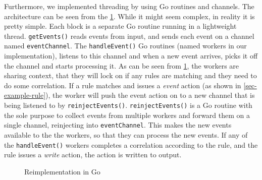 Furthermore, we implemented threading by using Go routines and channels. The architecture can be seen from the \cref{fig:reimplementation-architecture}. While it might seem complex, in reality it is pretty simple. Each block is a separate Go routine running in a lightweight thread. \lstinline{getEvents()} reads events from input, and sends each event on a channel named \lstinline{eventChannel}. The \lstinline{handleEvent()} Go routines (named workers in our implementation), listens to this channel and when a new event arrives, picks it off the channel and starts processing it. As can be seen from \cref{fig:reimplementation-architecture}, the workers are sharing context, that they will lock on if any rules are matching and they need to do some correlation. If a rule matches and issues a \textit{event} action (as shown in \cref{sec-example-rule}), the worker will push the event action on to a new channel that is being listened to by \lstinline{reinjectEvents()}. \lstinline{reinjectEvents()} is a Go routine with the sole purpose to collect events from multiple workers and forward them on a single channel, reinjecting into \lstinline{eventChannel}. This makes the new events available to the the workers, so that they can process the new events. If any of the \lstinline{handleEvent()} workers completes a correlation according to the rule, and the rule issues a \textit{write} action, the action is written to output.

\begin{figure}[htbp]
\centering
{}
\caption{Reimplementation in Go}
\label{fig:reimplementation-architecture}
\end{figure}


